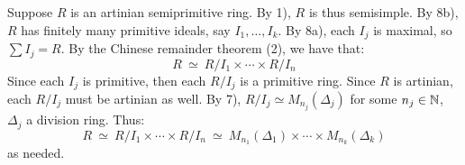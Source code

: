 \begin{pf}
	Suppose $R$ is an artinian semiprimitive ring.
	By 1), $R$ is thus semisimple.
	By 8b), $R$ has finitely many primitive ideals, say $I_{1},\dots,I_{k}$.
	By 8a), each $I_{j}$ is maximal, so $\sum I_{j}=R$.
	By the Chinese remainder theorem (2), we have that:
	\begin{equation*}
		R \ \simeq \ R/I_{1} \times \cdots \times R/I_{n}
	\end{equation*}
	Since each $I_{j}$ is primitive, then each $R/I_{j}$ is a primitive ring.
	Since $R$ is artinian, each $R/I_{j}$ must be artinian as well.
	By 7), $R/I_{j} \simeq M_{n_{j}}(\Delta_{j})$ for some $n_{j}\in\mathbb{N}$,
	$\Delta_{j}$ a division ring. Thus:
	\begin{equation*}
		R \ \simeq \ R/I_{1} \times \cdots \times R/I_{n}
		\ \simeq \ M_{n_{1}}(\Delta_{1}) \times \cdots \times M_{n_{k}}(\Delta_{k})
	\end{equation*}
	as needed.
\end{pf}

